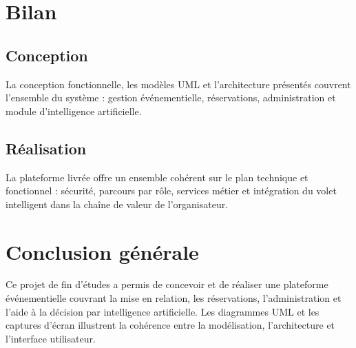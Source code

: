 \documentclass[a4paper,12pt]{report}
\begin{document}
\chapter{Bilan}

\section{Conception}

La conception fonctionnelle, les modèles UML et l'architecture présentés couvrent l'ensemble du système : gestion événementielle, réservations, administration et module d'intelligence artificielle.

\section{Réalisation}

La plateforme livrée offre un ensemble cohérent sur le plan technique et fonctionnel : sécurité, parcours par rôle, services métier et intégration du volet intelligent dans la chaîne de valeur de l'organisateur.

\chapter*{Conclusion générale}

\noindent
Ce projet de fin d'études a permis de concevoir et de réaliser une plateforme événementielle couvrant la mise en relation, les réservations, l'administration et l'aide à la décision par intelligence artificielle. Les diagrammes UML et les captures d'écran illustrent la cohérence entre la modélisation, l'architecture et l'interface utilisateur.
\end{document}
